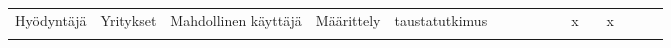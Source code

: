 \begin{table}[]
\begin{tabular}{llllllllllllllll}
Hyödyntäjä                                                                                                                                         & Yritykset                                                                                                           & Mahdollinen käyttäjä                                                                                             & Määrittely                                                                                     & taustatutkimus                                                                     &                                  &                                   &                                        &                                                                                         &                                      & x                                                     &                                      & x                                                                                                  &                                     &                                   &                                 \\
                                                                                                                                                   &                                                                                                                     &                                                                                                                  &                                                                                                &                                                                                    &                                  &                                   &                                        &                                                                                         &                                      &                                                       &                                      &                                                                                                    &                                     &                                   &                                 \\

\end{tabular}
\end{table}
